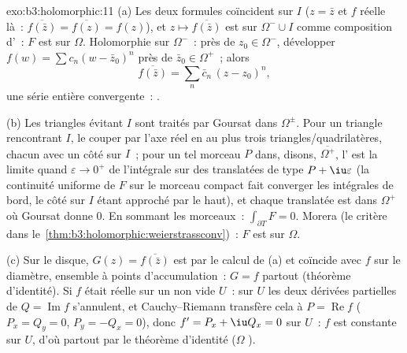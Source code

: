 \begin{solution}{exo:b3:holomorphic:11}
(a) Les deux formules coïncident sur $I$ ($z = \bar z$ et $f$
réelle là~: $\overline{f(\bar z)} = \overline{f(z)} =
f(z)$), et $z \mapsto \overline{f(\bar z)}$ est  sur
$\Omega^-\cup I$ comme composition d'~: $F$ est  sur $\Omega$. Holomorphie sur
$\Omega^-$~: près de $z_0 \in \Omega^-$, développer $f(w) =
\sum c_n(w - \bar z_0)^n$ près de $\bar z_0 \in \Omega^+$~;
alors
\[
\overline{f(\bar z)} = \sum_n\bar c_n\,(z - z_0)^n,
\]
une série entière convergente~: .

(b) Les triangles évitant $I$ sont traités par Goursat dans
$\Omega^\pm$. Pour un triangle rencontrant $I$, le couper
par l'axe réel en au plus trois triangles/quadrilatères,
chacun avec un côté sur $I$~; pour un tel morceau $P$ 
dans, disons, $\overline{\Omega^+}$, l'
est la limite quand $\varepsilon \to 0^+$ de l'intégrale sur
des translatées de type $P + \iu\varepsilon$ (la continuité
uniforme de $F$ sur le morceau compact fait converger les
intégrales de bord, le côté sur $I$ étant approché par le
haut), et chaque translatée est dans $\Omega^+$ où Goursat
donne $0$. En sommant les morceaux~: $\int_{\partial T}F =
0$. Morera (le critère dans
le~\cref{thm:b3:holomorphic:weierstrassconv})~: $F$ est
 sur $\Omega$.

(c) Sur le disque, $G(z) = \overline{f(\bar z)}$ est
 par le calcul de (a) et coïncide avec $f$ sur le
diamètre, ensemble à points d'accumulation~: $G = f$
partout (théorème d'identité). Si $f$ était réelle sur un
 non vide $U$~: sur $U$ les deux dérivées partielles de
$Q = \operatorname{Im}f$ s'annulent, et Cauchy--Riemann
transfère cela à $P = \operatorname{Re}f$ ($P_x = Q_y = 0$,
$P_y = -Q_x = 0$), donc $f' = P_x + \iu Q_x = 0$ sur $U$~:
$f$ est constante sur $U$, d'où partout par le théorème
d'identité ($\Omega$ ).
\end{solution}

